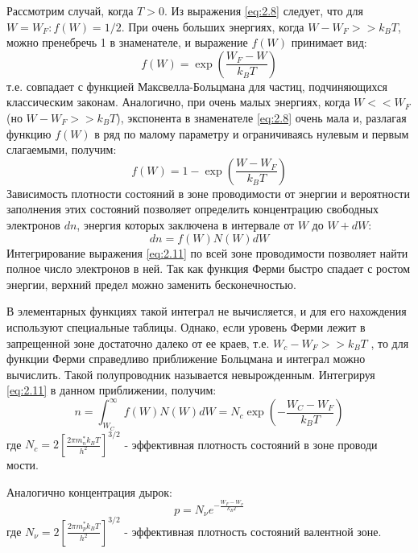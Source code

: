 		Рассмотрим случай, когда $T > 0$. Из выражения \eqref{eq:2.8} следует, что для $W=W_F: f(W) =1/2$. При очень больших энергиях, когда 
		$ W-W_F>> k_B T $, можно пренебречь 1 в знаменателе, и выражение $f(W)$ принимает вид:
		\begin{equation}
		f(W) = \exp(\frac{W_F-W}{k_B T})
		\label{eq:2.9}
		\end{equation} 
		т.е. совпадает с функцией Максвелла-Больцмана для частиц, подчиняющихся классическим законам. Аналогично, при очень
		малых энергиях, когда $W<<W_F$ (но $W-W_F>>k_B T$), экспонента в знаменателе \eqref{eq:2.8} очень мала и, разлагая функцию $f(W)$ в ряд по
		малому параметру и ограничиваясь нулевым и первым слагаемыми, получим: 
		\begin{equation}
		f(W) = 1 - \exp( \frac{W-W_F}{k_BT})
		\label{eq:2.10}
		\end{equation}
		Зависимость плотности состояний в зоне проводимости от энергии и вероятности заполнения этих состояний позволяет
		определить концентрацию свободных электронов $dn$, энергия которых заключена в интервале от $W$ до $W+dW$:
		\begin{equation}
		dn = f(W) N(W)dW
		\label{eq:2.11}
		\end{equation}
		Интегрирование выражения \eqref{eq:2.11} по всей зоне проводимости позволяет найти полное число электронов в ней. Так как функция
		Ферми быстро спадает с ростом энергии, верхний предел можно заменить бесконечностью. 
		
		В элементарных функциях такой интеграл не вычисляется, и для его нахождения используют специальные таблицы. Однако, если
		уровень Ферми лежит в запрещенной зоне достаточно далеко от ее краев, т.е. $W_c - W_F>>k_B T$ , то для функции Ферми
		справедливо приближение Больцмана и интеграл можно вычислить. Такой полупроводник называется невырожденным. Интегрируя
		\eqref{eq:2.11} в данном приближении, получим: 
		\begin{equation}
		n=\int_{W_{C}}^{\infty} f(W) N(W) d W=N_{c} \exp(-\frac{W_C-W_F}{k_B T})
		\label{eq:2.12}
		\end{equation}
		где $N_{c}=2\left[\frac{2 \pi m_{n}^{*} k_{B} T}{h^{2}}\right]^{3 / 2}$ - эффективная плотность состояний в зоне проводи
		мости.
		
		Аналогично концентрация дырок: 
		\begin{equation}
		p=N_{\nu} e^{-\frac{W_{F}-W_{\nu}}{k_{B} T}}
		\label{eq:2.13}
		\end{equation}
		где $N_{\nu}=2\left[\frac{2 \pi m_{p}^{*} k_{B} T}{h^{2}}\right]^{3 / 2}$ - эффективная плотность состояний валентной зоне.
		
